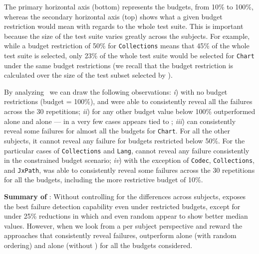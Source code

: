 The primary horizontal axis (bottom) represents the budgets, from 10\% to 100\%,
whereas the secondary horizontal axis (top) shows what a given budget restriction would mean with regards to the whole test suite.
This is important because the size of the test suite varies greatly across the subjects.
For example, while a budget restriction of 50\% for \texttt{Collections} means that 45\% of the whole test suite is selected, 
only 23\% of the whole test suite would be selected for \texttt{Chart} under the same budget restrictions
(we recall that the budget restriction is calculated over the size of the test subset selected by \ek).


By analyzing~ we can draw the following observations:
\textit{i}) with no budget restrictions (budget = 100\%), \ekr and \fz were able to consistently reveal all the failures across the 30 repetitions;
\textit{ii}) for any other budget value below 100\% \fz outperformed \ek alone and \fs alone --- in a very few cases \fs appears tied to \fz;
\textit{iii}) \ekr can consistently reveal some failures for almost all the budgets for \texttt{Chart}. 
For all the other subjects, it cannot reveal any failure for budgets restricted below 50\%.
For the particular cases of \texttt{Collections} and \texttt{Lang}, \ekr cannot reveal any failure consistently in the constrained budget scenario;
\textit{iv}) with the exception of \texttt{Codec}, \texttt{Collections}, and \texttt{JxPath}, 
\fz was able to consistently reveal some failures across the 30 repetitions for all the budgets, including the more restrictive budget of 10\%.

\begin{tcolorbox}%
\textbf{Summary of }: 
Without controlling for the differences across subjects, 
\fz exposes the best failure detection capability even under restricted budgets, 
except for under 25\% reductions in which \ekr and even random appear to show better median values.
However, when we look from a per subject perspective and reward the approaches that consistently reveal failures,
\fz outperform \ek alone (with random ordering) and \fs alone (without \tcs) for all the budgets considered.
\end{tcolorbox}




